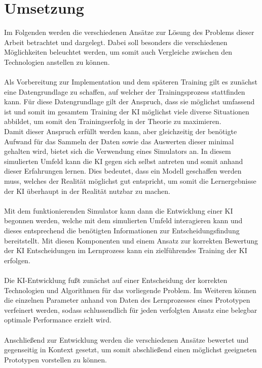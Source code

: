 \section{Umsetzung}
Im Folgenden werden die verschiedenen Ansätze zur Lösung des Problems dieser Arbeit betrachtet und dargelegt. Dabei soll besonders die verschiedenen Möglichkeiten beleuchtet werden, um somit auch Vergleiche zwischen den Technologien anstellen zu können.\\\\
Als Vorbereitung zur Implementation und dem späteren Training gilt es zunächst eine Datengrundlage zu schaffen, auf welcher der Trainingsprozess stattfinden kann. Für diese Datengrundlage gilt der Anspruch, dass sie möglichst umfassend ist und somit im gesamtem Training der KI möglichst viele diverse Situationen abbildet, um somit den Trainingserfolg in der Theorie zu maximieren.\\
Damit dieser Anspruch erfüllt werden kann, aber gleichzeitig der benötigte Aufwand für das Sammeln der Daten sowie das Auswerten dieser minimal gehalten wird, bietet sich die Verwendung eines Simulators an. In diesem simulierten Umfeld kann die KI gegen sich selbst antreten und somit anhand dieser Erfahrungen lernen. Dies bedeutet, dass ein Modell geschaffen werden muss, welches der Realität möglichst gut entspricht, um somit die Lernergebnisse der KI überhaupt in der Realität nutzbar zu machen.\\\\
Mit dem funktionierenden Simulator kann dann die Entwicklung einer KI begonnen werden, welche mit dem simulierten Umfeld interagieren kann und dieses entsprechend die benötigten Informationen zur Entscheidungsfindung bereitstellt. Mit diesen Komponenten und einem Ansatz zur korrekten Bewertung der KI Entscheidungen im Lernprozess kann ein zielführendes Training der KI erfolgen.\\\\
Die KI-Entwicklung fußt zunächst auf einer Entscheidung der korrekten Technologien und Algorithmen für das vorliegende Problem. Im Weiteren können die einzelnen Parameter anhand von Daten des Lernprozesses eines Prototypen verfeinert werden, sodass schlussendlich für jeden verfolgten Ansatz eine belegbar optimale Performance erzielt wird.\\\\
Anschließend zur Entwicklung werden die verschiedenen Ansätze bewertet und gegenseitig in Kontext gesetzt, um somit abschließend einen möglichst geeigneten Prototypen vorstellen zu können.

